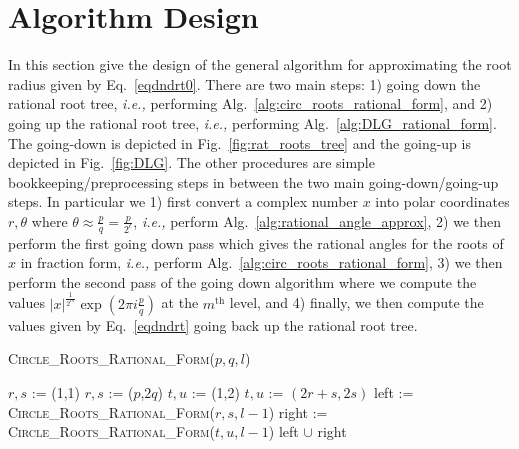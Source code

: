 \documentclass[sigconf]{acmart}
\begin{document}
\section{Algorithm Design}

In this section give the design of the general algorithm for approximating the root radius given by Eq.~\ref{eqdndrt0}.
There are two main steps: 1) going down the rational root tree, \emph{i.e.,} performing Alg.~\ref{alg:circ_roots_rational_form}, and 2) going up the rational root tree, \emph{i.e.,} performing Alg.~\ref{alg:DLG_rational_form}.
The going-down is depicted in Fig.~\ref{fig:rat_roots_tree} and the going-up is depicted in Fig.~\ref{fig:DLG}.
The other procedures are simple bookkeeping/preprocessing steps in between the two main going-down/going-up steps.
In particular we
1) first convert a complex number $x$ into polar coordinates $r,\theta$ where $\theta \approx \frac{p}{q} = \frac{p}{2^\epsilon}$, \emph{i.e.,} perform Alg.~\ref{alg:rational_angle_approx},
2) we then perform the first going down pass which gives the rational angles for the roots of $x$ in fraction form, \emph{i.e.,} perform Alg.~\ref{alg:circ_roots_rational_form},
3) we then perform the second pass of the going down algorithm where we compute the values $|x|^{\frac{1}{2^m}} \exp(2 \pi i \frac{p}{q})$ at the $m^\mathrm{th}$ level, and
4) finally, we then compute the values given by Eq.~\ref{eqdndrt} going back up the rational root tree.

\begin{algorithm}
   \caption{\textsc{Circle\_Roots\_Rational\_Form}($p,q,l$)}
   \label{alg:circ_roots_rational_form}
\begin{algorithmic}
  \STATE  $r, s$ := (1,1)
\ELSE
  \STATE  $r, s$ := ($p$,$2q$)
\ENDIF
    \STATE $t, u$ := (1,2)
  \ELSE
    \STATE $t, u$ := $(2r+s, 2s)$
  \ENDIF
		  \RETURN [($r,s$),($t,u$)]
		\STATE left  := \textsc{Circle\_Roots\_Rational\_Form}($r,s,l-1$)
		\STATE right := \textsc{Circle\_Roots\_Rational\_Form}($t,u,l-1$)
		\RETURN left $\cup$ right
	\ELSE
		\RETURN  [($p,q$)]
      \ENDIF
\end{algorithmic}
\end{algorithm}
\end{document}
